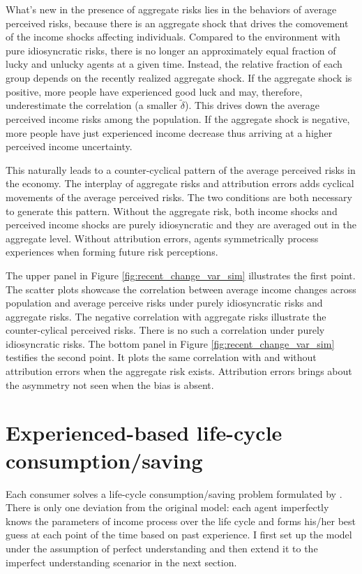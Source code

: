 \documentclass[12pt,notitlepage,onecolumn,aps,pra]{article}
\begin{document}
What's new in the presence of aggregate risks lies in the behaviors of
average perceived risks, because there is an aggregate shock that drives
the comovement of the income shocks affecting individuals. Compared to
the environment with pure idiosyncratic risks, there is no longer an
approximately equal fraction of lucky and unlucky agents at a given
time. Instead, the relative fraction of each group depends on the
recently realized aggregate shock. If the aggregate shock is positive,
more people have experienced good luck and may, therefore, underestimate
the correlation (a smaller \(\tilde \delta\)). This drives down the
average perceived income risks among the population. If the aggregate
shock is negative, more people have just experienced income decrease
thus arriving at a higher perceived income uncertainty.

This naturally leads to a counter-cyclical pattern of the average
perceived risks in the economy. The interplay of aggregate risks and
attribution errors adds cyclical movements of the average perceived
risks. The two conditions are both necessary to generate this pattern.
Without the aggregate risk, both income shocks and perceived income
shocks are purely idiosyncratic and they are averaged out in the
aggregate level. Without attribution errors, agents symmetrically
process experiences when forming future risk perceptions.

The upper panel in Figure \ref{fig:recent_change_var_sim} illustrates
the first point. The scatter plots showcase the correlation between
average income changes across population and average perceive risks
under purely idiosyncratic risks and aggregate risks. The negative
correlation with aggregate risks illustrate the counter-cylical
perceived risks. There is no such a correlation under purely
idiosyncratic risks. The bottom panel in Figure
\ref{fig:recent_change_var_sim} testifies the second point. It plots the
same correlation with and without attribution errors when the aggregate
risk exists. Attribution errors brings about the asymmetry not seen when
the bias is absent.



    \hypertarget{experienced-based-life-cycle-consumptionsaving}{%
\section{Experienced-based life-cycle
consumption/saving}\label{experienced-based-life-cycle-consumptionsaving}}

Each consumer solves a life-cycle consumption/saving problem formulated
by \cite{gourinchas2002consumption}. There is only one deviation from
the original model: each agent imperfectly knows the parameters of
income process over the life cycle and forms his/her best guess at each
point of the time based on past experience. I first set up the model
under the assumption of perfect understanding and then extend it to the
imperfect understanding scenarior in the next section.
\end{document}
